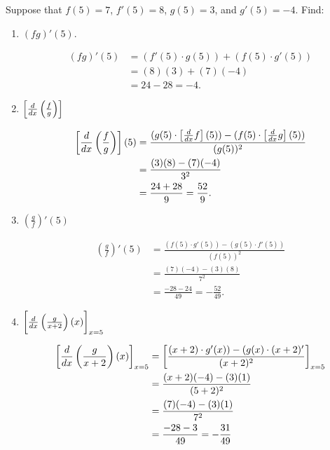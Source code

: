 \documentclass[nooutcomes, handout]{ximera}
\begin{document}
\begin{problem}
Suppose that $f(5) = 7$, $f'(5) = 8$, $g(5) = 3$, and $g'(5) = -4$.  Find:

	\begin{enumerate}

	\item  $(fg)'(5)$.
		\begin{freeResponse}
		\begin{align*}
		(fg)'(5) &= (f'(5) \cdot g(5)) + (f(5) \cdot g'(5))  \\
		&= (8)(3) + (7)(-4)  \\
		&= 24 - 28 = -4.
		\end{align*}
		\end{freeResponse}
		
		

	\item $\left[ \frac{d}{dx} \left( \frac{f}{g} \right) \right]$
		\begin{freeResponse}
		\begin{align*}
		\left[ \frac{d}{dx} \left( \frac{f}{g} \right) \right] (5) &= \frac{(g(5) \cdot \left[ \frac{d}{dx} f \right] (5)) - (f(5) \cdot \left[ \frac{d}{dx} g \right](5))}{(g(5))^2}  \\
		&= \frac{(3)(8) - (7)(-4)}{3^2}  \\
		&= \frac{24 + 28}{9} = \frac{52}{9}.
		\end{align*}
		\end{freeResponse}
		
		
	\item $ \left( \frac{g}{f} \right)' (5)$
		\begin{freeResponse}
		\begin{align*}
		\left( \frac{g}{f} \right)' (5) &= \frac{(f(5) \cdot g'(5)) - (g(5) \cdot f'(5))}{(f(5))^2}  \\
		&= \frac{(7)(-4) - (3)(8)}{7^2}  \\
		&= \frac{-28 - 24}{49} = - \frac{52}{49}.
		\end{align*}
		\end{freeResponse}
		
	\item  $\bigg[  \frac{d}{dx} \left( \frac{g}{x+2} \right) (x) \bigg]_{x=5}$
		\begin{freeResponse}
		\begin{align*}
		\bigg[ \frac{d}{dx} \left( \frac{g}{x+2} \right) (x) \bigg]_{x=5} &= \bigg[ \frac{(x+2) \cdot g'(x)) - (g(x) \cdot (x+2)'}{(x+2)^2} \bigg]_{x=5}  \\
		&= \frac{(x+2)(-4) - (3)(1)}{(5+2)^2}  \\
		&= \frac{(7)(-4) - (3)(1)}{7^2}  \\
		&= \frac{-28 - 3}{49} = - \frac{31}{49}
		\end{align*}
		\end{freeResponse}




\end{enumerate}
\end{problem}
\end{document}
